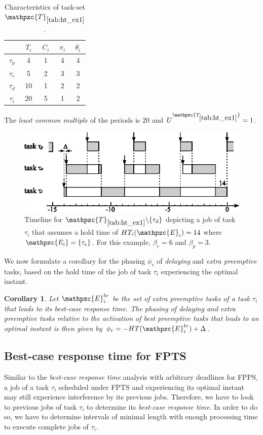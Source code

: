 \documentclass[fleqn]{article}
\newtheorem{corollary}{Corollary}
\begin{document}
\begin{table}[H]
	\center
	\caption{Characteristics of task-set $\mathpzc{T}_{\ref{tab:ht_ex1}}$.}
	\label{tab:ht_ex1}
	\begin{tabular}{c c c c c }
		\hline 
		& $T_i$ & $C_i$ & $\pi_i$ & $\theta_i$\\ 
		\hline 
		$\tau_{p}$& 4 & 1  & 4 & 4 \\ 
		$\tau_{e}$& 5 & 2  & 3 & 3 \\ 
		$\tau_d$& 10 & 1 & 2 & 2 \\ 
		$\tau_i$& 20 & 5 & 1 & 2 \\
		\hline 
	\end{tabular}
	\small
	\item The \textit{least common multiple} of the periods is 20 and $U^{\mathpzc{T_{\ref{tab:ht_ex1}}}}=1$.
\end{table}

\begin{figure}[H]
	\centering
	\includegraphics[width=0.7\linewidth]{figures/ht_ex1}
	\caption{Timeline for $\mathpzc{T}_{\ref{tab:ht_ex1}}\backslash\{\tau_d\}$ depicting a job of task $\tau_i$ that assumes a hold time of $HT_i(\mathpzc{E}_i)=14$ where $\mathpzc{E_i} = \{\tau_e\}$. For this example, $\beta_e = 6$ and $\beta_p = 3$.}
	\label{fig:ht_ex1}
\end{figure}

We now formulate a corollary for the phasing $\phi_r$ of \textit{delaying} and \textit{extra preemptive} tasks, based on the hold time of the job of task $\tau_i$ experiencing the optimal instant.

\begin{corollary} \label{col:relative_phasing}
	Let $\mathpzc{E}^{br}_i$ be the set of \textit{extra preemptive} tasks of a task $\tau_i$ that leads to its best-case response time. The phasing of delaying and extra preemptive tasks relative to the activation of best preemptive tasks that leads to an optimal instant is then given by $\phi_r = -HT(\mathpzc{E}^{br}_i)+\Delta$.
\end{corollary}


\subsection{Best-case response time for FPTS}
Similar to the \textit{best-case response time} analysis with arbitrary deadlines for FPPS, a job of a task $\tau_i$ scheduled under FPTS and experiencing its optimal instant may still experience interference by its previous jobs. Therefore, we have to look to previous jobs of task $\tau_i$ to determine its \textit{best-case response time}. In order to do so,  we have to determine intervals of minimal length with enough processing time to execute complete jobs of $\tau_i$.
\end{document}
